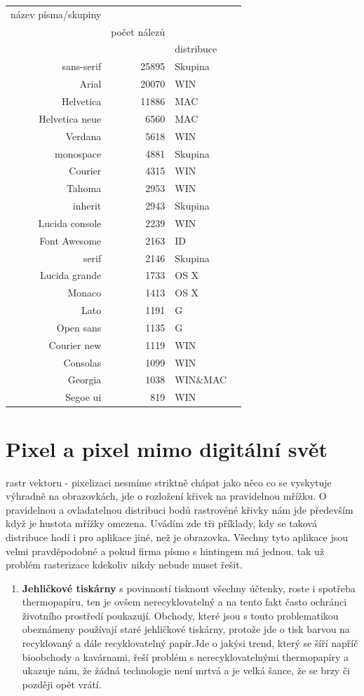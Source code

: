\documentclass[a4paper]{article}
\begin{document}
\begin{enumerate}
\begin{tabular}{r|rlr}
název písma/skupiny & \\
& počet nálezů & \\
&& distribuce&\\
\midrule
sans-serif & 25895 &  Skupina\\
Arial & 20070 & WIN\\
Helvetica & 11886 & MAC\\
Helvetica neue & 6560 & MAC\\
Verdana & 5618 & WIN\\
monospace & 4881 & Skupina\\
Courier & 4315 & WIN\\
Tahoma & 2953 & WIN\\
inherit & 2943 & Skupina\\
Lucida console & 2239 & WIN\\
Font Awesome & 2163 & ID\\
serif & 2146 & Skupina\\
Lucida grande & 1733 & OS X\\
Monaco & 1413 & OS X\\
Lato & 1191 & G\\
Open sans & 1135 & G\\
Courier new & 1119 & WIN\\
Consolas & 1099 & WIN\\
Georgia &  1038 & WIN\&MAC\\
Segoe ui & 819 & WIN\\
\end{tabular}

\section{Pixel a pixel mimo digitální svět}
rastr vektoru - pixelizaci nesmíme striktně chápat jako něco co se vyskytuje výhradně na obrazovkách, jde o rozložení křivek na pravidelnou mřížku. O pravidelnou a ovladatelnou distribuci bodů rastrovéné křivky nám jde především když je hustota mřížky omezena. Uvádím zde tři příklady, kdy se taková distribuce hodí i pro aplikace jiné, než je obrazovka. Všechny tyto aplikace jsou velmi pravděpodobné a pokud firma písmo s hintingem má jednou, tak už problém rasterizace kdekoliv nikdy nebude muset řešit.\\

\begin{enumerate}
\item \textbf{Jehličkové tiskárny} s povinností tisknout všechny účtenky, roste i spotřeba thermopapíru, ten je ovšem nerecyklovatelný a na tento fakt často ochránci životního prostředí poukazují. Obchody, které jsou s touto problematikou obeznámeny používají staré jehličkové tiskárny, protože jde o tisk barvou na recyklovaný a dále recyklovatelný papír.Jde o jakýsi trend, který se šíří napříč bioobchody a kavárnami, řeší problém s nerecyklovatelnými thermopapíry a ukazuje nám, že žádná technologie není mrtvá a je velká šance, že se brzy či později opět vrátí. 


\end{enumerate}
\end{enumerate}
\end{document}
